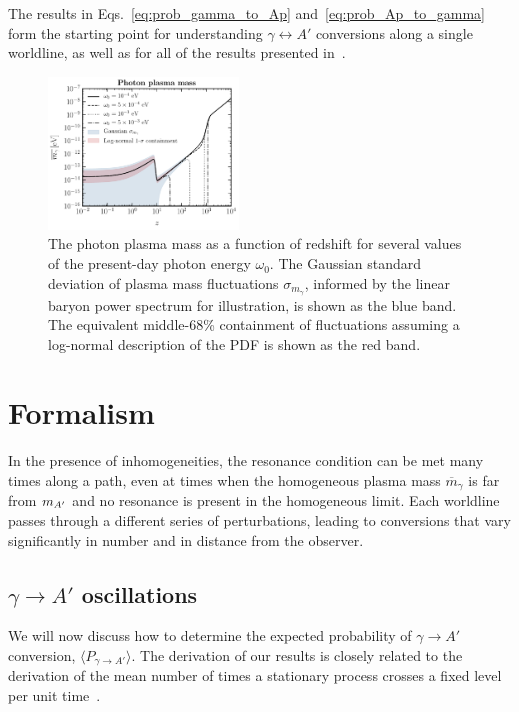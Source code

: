\documentclass[prd,aps,10pt,nofootinbib,twocolumn,superscriptaddress,preprintnumbers,balancelastpage,longbibliography]{revtex4-1}
\begin{document}
The results in Eqs.~\eqref{eq:prob_gamma_to_Ap} and~\eqref{eq:prob_Ap_to_gamma} form the starting point for understanding $\gamma \leftrightarrow A'$ conversions along a single worldline, as well as for all of the results presented in~.

%
\begin{figure}
    \centering
    \includegraphics[width=0.45\textwidth]{plots/m_Ap_single_LN.pdf}
    \caption{The photon plasma mass as a function of redshift for several values of the present-day photon energy $\omega_0$. The Gaussian standard deviation of plasma mass fluctuations $\sigma_{m_\gamma}$, informed by the linear baryon power spectrum for illustration, is shown as the blue band. The equivalent middle-68\% containment of fluctuations assuming a log-normal description of the PDF is shown as the red band.~}
    \label{fig:m_Ap_single_LN}
\end{figure}
%

\section{Formalism}
\label{Sec:Formalism}

In the presence of inhomogeneities, the resonance condition can be met many times along a path, even at times when the homogeneous plasma mass $\overline{m}_\gamma$ is far from $m_{A^\prime}$ and no resonance is present in the homogeneous limit. 
Each worldline passes through a different series of perturbations, leading to conversions that vary significantly in number and in distance from the observer. 

\subsection{\texorpdfstring{$\gamma \to A'$ oscillations}{Photon-dark photon oscillations}}

We will now discuss how to determine the expected probability of $\gamma \to A'$ conversion, $\langle P_{\gamma \to A'} \rangle$. The derivation of our results is closely related to the derivation of the mean number of times a stationary process crosses a fixed level per unit time~\cite{rice1944mathematical,lindgren2013stationary}. 
\end{document}
